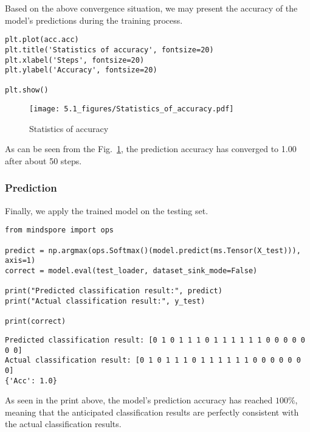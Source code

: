 Based on the above convergence situation, we may present the accuracy of the model's predictions during the training process. %

\begin{lstlisting}
plt.plot(acc.acc)
plt.title('Statistics of accuracy', fontsize=20)
plt.xlabel('Steps', fontsize=20)
plt.ylabel('Accuracy', fontsize=20)

plt.show()
\end{lstlisting}

\begin{figure}[H]
    \centering
    \texttt{[image: 5.1\_figures/Statistics\_of\_accuracy.pdf]}
    \caption{Statistics of accuracy}
    \label{5.1Statistics_of_accuracy}
\end{figure}

As can be seen from the Fig.~\ref{5.1Statistics_of_accuracy}, the prediction accuracy has converged to 1.00 after about 50 steps.

\subsubsection{Prediction}
Finally, we apply the trained model on the testing set.
\begin{lstlisting}
from mindspore import ops

predict = np.argmax(ops.Softmax()(model.predict(ms.Tensor(X_test))), axis=1)
correct = model.eval(test_loader, dataset_sink_mode=False)

print("Predicted classification result:", predict)
print("Actual classification result:", y_test)

print(correct)
\end{lstlisting}

\begin{lstlisting}
Predicted classification result: [0 1 0 1 1 1 0 1 1 1 1 1 1 0 0 0 0 0 0 0]
Actual classification result: [0 1 0 1 1 1 0 1 1 1 1 1 1 0 0 0 0 0 0 0]
{'Acc': 1.0}
\end{lstlisting}

As seen in the print above, the model's prediction accuracy has reached $100\%$, meaning that the anticipated classification results are perfectly consistent with the actual classification results.
